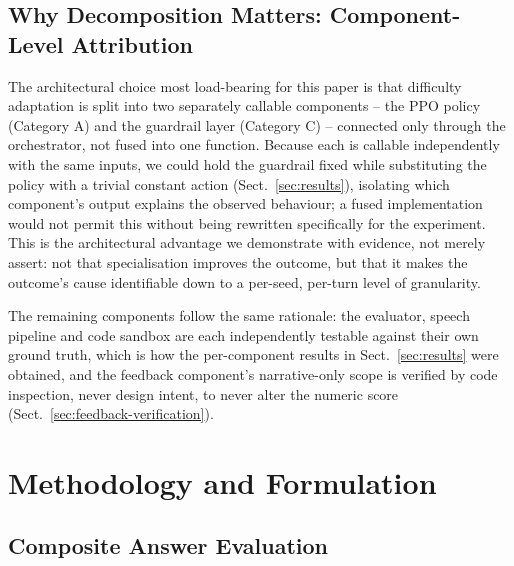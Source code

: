 \documentclass[runningheads]{llncs}
\begin{document}
\subsection{Why Decomposition Matters: Component-Level Attribution}

The architectural choice most load-bearing for this paper is that difficulty adaptation is split into two separately callable components -- the PPO policy (Category A) and the guardrail layer (Category C) -- connected only through the orchestrator, not fused into one function. Because each is callable independently with the same inputs, we could hold the guardrail fixed while substituting the policy with a trivial constant action (Sect.~\ref{sec:results}), isolating which component's output explains the observed behaviour; a fused implementation would not permit this without being rewritten specifically for the experiment. This is the architectural advantage we demonstrate with evidence, not merely assert: not that specialisation improves the outcome, but that it makes the outcome's cause identifiable down to a per-seed, per-turn level of granularity.

The remaining components follow the same rationale: the evaluator, speech pipeline and code sandbox are each independently testable against their own ground truth, which is how the per-component results in Sect.~\ref{sec:results} were obtained, and the feedback component's narrative-only scope is verified by code inspection, never design intent, to never alter the numeric score (Sect.~\ref{sec:feedback-verification}).

\section{Methodology and Formulation}
\label{sec:methodology}

\subsection{Composite Answer Evaluation}
\end{document}
